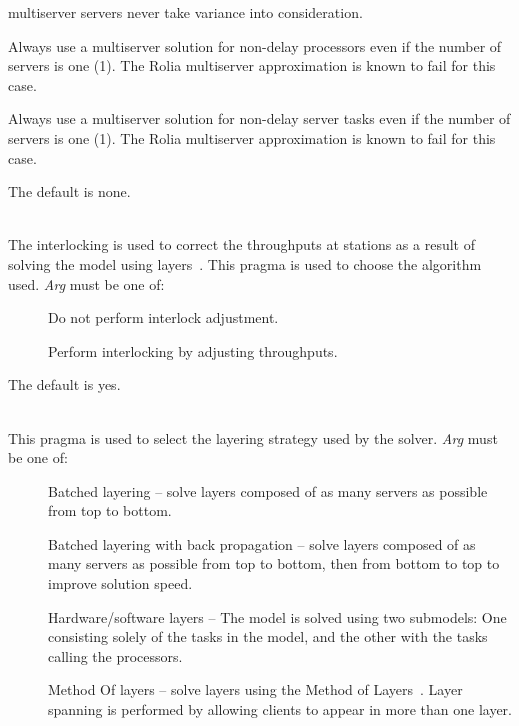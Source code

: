 \begin{description}
\begin{description}
multiserver servers never take variance into consideration.
\item[\optarg{processors}{}]
Always use a multiserver solution for non-delay processors even if the number of servers is one (1).
The Rolia multiserver approximation is known to fail for this case.
\item[\optarg{tasks}{}]
Always use a multiserver solution for non-delay server tasks even if the number of servers is one (1).
The Rolia multiserver approximation is known to fail for this case.
\end{description}
The default is none.
\item[\optarg{interlocking}{=\emph{arg}}]~\\
The interlocking is used to correct the throughputs at stations as a
result of solving the model using layers~\cite{perf:franks-95-ipds-interlock}.  This pragma is used to
choose the algorithm used.
\emph{Arg} must be one of: 
\begin{description}
\item[]
Do not perform interlock adjustment.
\item[]
Perform interlocking by adjusting throughputs.
\end{description}
The default is yes.
\item[\optarg{layering}{=\emph{arg}}]~\\
This pragma is used to select the layering strategy used by the solver.
\emph{Arg} must be one of: 
\begin{description}
\item[]
Batched layering -- solve layers composed of as many servers as possible from top to bottom.
\item[]
Batched layering with back propagation -- solve layers composed of as many servers as possible from top to bottom, then from bottom to top to improve solution speed.
\item[]
Hardware/software layers -- The model is solved using two submodels:
One consisting solely of the tasks in the model, and the other with the tasks calling the processors.
\item[]
Method Of layers -- solve layers using the Method of Layers~\cite{perf:rolia-95-ieeese-mol}. Layer spanning is performed by allowing clients to appear in more than one layer.

\end{description}
\end{description}
